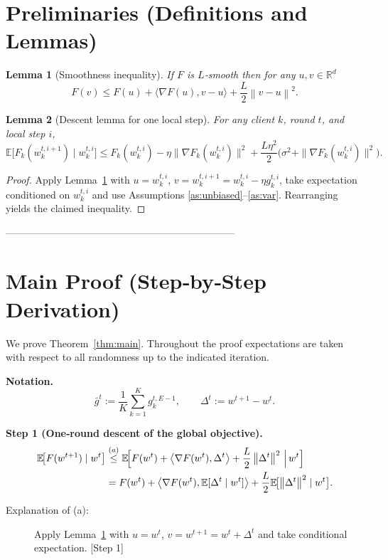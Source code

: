 \documentclass{article}
\newtheorem{lemma}{Lemma}
\newcommand{\EE}{\mathbb{E}}
\newcommand{\RR}{\mathbb{R}}
\newcommand{\norm}[1]{\left\|#1\right\|}
\begin{document}
\section*{Preliminaries (Definitions and Lemmas)}
\begin{lemma}[Smoothness inequality]\label{lem:smooth}
If $F$ is $L$‑smooth then for any $u,v\in\RR^{d}$
\[
F(v)\le F(u)+\langle\nabla F(u),v-u\rangle+\frac{L}{2}\norm{v-u}^{2}.
\]
\end{lemma}
\begin{lemma}[Descent lemma for one local step]\label{lem:local}
For any client $k$, round $t$, and local step $i$,
\[
\EE\!\bigl[F_k(w_{k}^{t,i+1})\mid w_{k}^{t,i}\bigr]
\le
F_k(w_{k}^{t,i})-\eta\bigl\|\nabla F_k(w_{k}^{t,i})\bigr\|^{2}
+\frac{L\eta^{2}}{2}\bigl(\sigma^{2}+\|\nabla F_k(w_{k}^{t,i})\|^{2}\bigr).
\]
\end{lemma}
\begin{proof}
Apply Lemma~\ref{lem:smooth} with $u=w_{k}^{t,i}$, $v=w_{k}^{t,i+1}=w_{k}^{t,i}-\eta g_{k}^{t,i}$,
take expectation conditioned on $w_{k}^{t,i}$ and use Assumptions
\ref{as:unbiased}–\ref{as:var}.  Rearranging yields the claimed inequality. \qedhere
\end{proof}

---------------------------------------------------------------------

\section*{Main Proof (Step‑by‑Step Derivation)}
We prove Theorem~\ref{thm:main}.  Throughout the proof expectations are taken
with respect to all randomness up to the indicated iteration.

\noindent\textbf{Notation.}
\[
\bar g^{t}:=\frac1K\sum_{k=1}^{K} g_{k}^{t,E-1},
\qquad
\Delta^{t}:=w^{t+1}-w^{t}.
\]

\noindent\textbf{Step 1 (One‑round descent of the global objective).}
\begin{align}
\EE\!\bigl[F(w^{t+1})\mid w^{t}\bigr]
&\overset{(a)}{\le}
\EE\!\Bigl[F(w^{t})+\big\langle\nabla F(w^{t}),\Delta^{t}\big\rangle
+\frac{L}{2}\norm{\Delta^{t}}^{2}\,\Big|\,w^{t}\Bigr] \label{eq:step1}\\
&=F(w^{t})+\big\langle\nabla F(w^{t}),\EE[\Delta^{t}\mid w^{t}]\big\rangle
+\frac{L}{2}\EE\!\bigl[\norm{\Delta^{t}}^{2}\mid w^{t}\bigr].
\end{align}
\begin{description}
\item[Explanation of (a):] Apply Lemma~\ref{lem:smooth} with $u=w^{t}$,
$v=w^{t+1}=w^{t}+\Delta^{t}$ and take conditional expectation. \hfill[Step 1]
\end{description}
\end{document}
